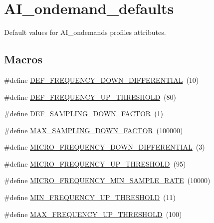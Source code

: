 \hypertarget{group__AI__ondemand__defaults}{}\section{A\+I\+\_\+ondemand\+\_\+defaults}
\label{group__AI__ondemand__defaults}


Default values for A\+I\+\_\+ondemand\textquotesingle{}s profile\textquotesingle{}s attributes.  


\subsection*{Macros}
\begin{DoxyCompactItemize}
\item 
\#define \hyperlink{group__AI__ondemand__defaults_ga84aa2cf848aacc6922374cf2f3784791}{D\+E\+F\+\_\+\+F\+R\+E\+Q\+U\+E\+N\+C\+Y\+\_\+\+D\+O\+W\+N\+\_\+\+D\+I\+F\+F\+E\+R\+E\+N\+T\+I\+AL}~(10)
\item 
\#define \hyperlink{group__AI__ondemand__defaults_gaf333604b3a157d2667d935fd28b8f41e}{D\+E\+F\+\_\+\+F\+R\+E\+Q\+U\+E\+N\+C\+Y\+\_\+\+U\+P\+\_\+\+T\+H\+R\+E\+S\+H\+O\+LD}~(80)
\item 
\#define \hyperlink{group__AI__ondemand__defaults_gac327c0ab9ff9ad79c31f534947bc655c}{D\+E\+F\+\_\+\+S\+A\+M\+P\+L\+I\+N\+G\+\_\+\+D\+O\+W\+N\+\_\+\+F\+A\+C\+T\+OR}~(1)
\item 
\#define \hyperlink{group__AI__ondemand__defaults_ga2c642e1b37300c90cf0c33ce7803730e}{M\+A\+X\+\_\+\+S\+A\+M\+P\+L\+I\+N\+G\+\_\+\+D\+O\+W\+N\+\_\+\+F\+A\+C\+T\+OR}~(100000)
\item 
\#define \hyperlink{group__AI__ondemand__defaults_ga854a80839fecd84d1e46578a291d2bd2}{M\+I\+C\+R\+O\+\_\+\+F\+R\+E\+Q\+U\+E\+N\+C\+Y\+\_\+\+D\+O\+W\+N\+\_\+\+D\+I\+F\+F\+E\+R\+E\+N\+T\+I\+AL}~(3)
\item 
\#define \hyperlink{group__AI__ondemand__defaults_ga781179ae6fb967625c6fe07106922f50}{M\+I\+C\+R\+O\+\_\+\+F\+R\+E\+Q\+U\+E\+N\+C\+Y\+\_\+\+U\+P\+\_\+\+T\+H\+R\+E\+S\+H\+O\+LD}~(95)
\item 
\#define \hyperlink{group__AI__ondemand__defaults_ga4781f59495e6ba2743df8e6067087148}{M\+I\+C\+R\+O\+\_\+\+F\+R\+E\+Q\+U\+E\+N\+C\+Y\+\_\+\+M\+I\+N\+\_\+\+S\+A\+M\+P\+L\+E\+\_\+\+R\+A\+TE}~(10000)
\item 
\#define \hyperlink{group__AI__ondemand__defaults_ga22c68cd57bee10cf7919967f35922cef}{M\+I\+N\+\_\+\+F\+R\+E\+Q\+U\+E\+N\+C\+Y\+\_\+\+U\+P\+\_\+\+T\+H\+R\+E\+S\+H\+O\+LD}~(11)
\item 
\#define \hyperlink{group__AI__ondemand__defaults_ga359eab7941c52cf39c7d34b8f1bd2369}{M\+A\+X\+\_\+\+F\+R\+E\+Q\+U\+E\+N\+C\+Y\+\_\+\+U\+P\+\_\+\+T\+H\+R\+E\+S\+H\+O\+LD}~(100)
\end{DoxyCompactItemize}


